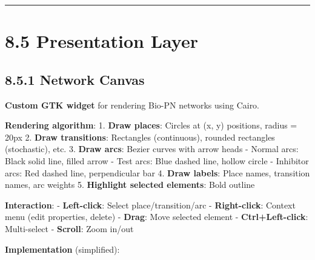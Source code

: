 \begin{center}\rule{0.5\linewidth}{0.5pt}\end{center}

\hypertarget{presentation-layer}{%
\section{8.5 Presentation Layer}\label{presentation-layer}}

\hypertarget{network-canvas}{%
\subsection{8.5.1 Network Canvas}\label{network-canvas}}

\textbf{Custom GTK widget} for rendering Bio-PN networks using Cairo.

\textbf{Rendering algorithm}: 1. \textbf{Draw places}: Circles at (x, y)
positions, radius = 20px 2. \textbf{Draw transitions}: Rectangles
(continuous), rounded rectangles (stochastic), etc. 3. \textbf{Draw
arcs}: Bezier curves with arrow heads - Normal arcs: Black solid line,
filled arrow - Test arcs: Blue dashed line, hollow circle - Inhibitor
arcs: Red dashed line, perpendicular bar 4. \textbf{Draw labels}: Place
names, transition names, arc weights 5. \textbf{Highlight selected
elements}: Bold outline

\textbf{Interaction}: - \textbf{Left-click}: Select place/transition/arc
- \textbf{Right-click}: Context menu (edit properties, delete) -
\textbf{Drag}: Move selected element - \textbf{Ctrl+Left-click}:
Multi-select - \textbf{Scroll}: Zoom in/out

\textbf{Implementation} (simplified):

